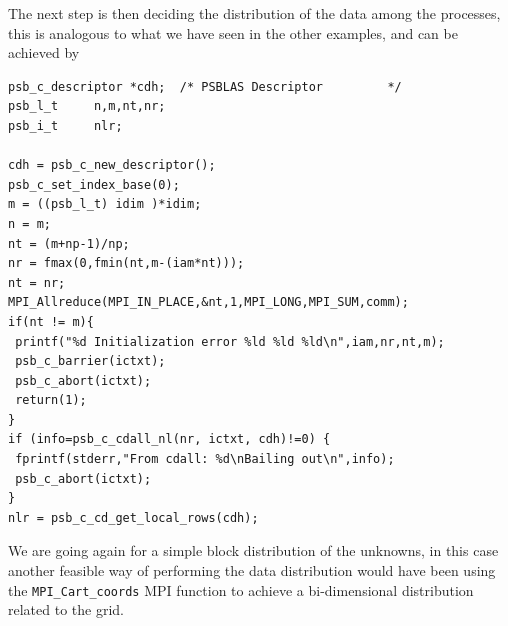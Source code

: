 \documentclass[twoside,a4paper]{refart}
\theoremstyle{definition}
\begin{document}
The next step is then deciding the distribution of the data among the processes, this is analogous to what we have seen in the other examples, and can be achieved by
\begin{lstlisting}[style=CStyle]
psb_c_descriptor *cdh;  /* PSBLAS Descriptor         */
psb_l_t     n,m,nt,nr;
psb_i_t     nlr;

cdh = psb_c_new_descriptor();
psb_c_set_index_base(0);
m = ((psb_l_t) idim )*idim;
n = m;
nt = (m+np-1)/np;
nr = fmax(0,fmin(nt,m-(iam*nt)));
nt = nr;
MPI_Allreduce(MPI_IN_PLACE,&nt,1,MPI_LONG,MPI_SUM,comm);
if(nt != m){
 printf("%d Initialization error %ld %ld %ld\n",iam,nr,nt,m);
 psb_c_barrier(ictxt);
 psb_c_abort(ictxt);
 return(1);
}
if (info=psb_c_cdall_nl(nr, ictxt, cdh)!=0) {
 fprintf(stderr,"From cdall: %d\nBailing out\n",info);
 psb_c_abort(ictxt);
}
nlr = psb_c_cd_get_local_rows(cdh);
\end{lstlisting}
We are going again for a simple block distribution of the unknowns, in this case another feasible way of performing the data distribution would have been using the \lstinline[style=CStyle]|MPI_Cart_coords| MPI function to achieve a bi-dimensional distribution related to the grid.
\end{document}
